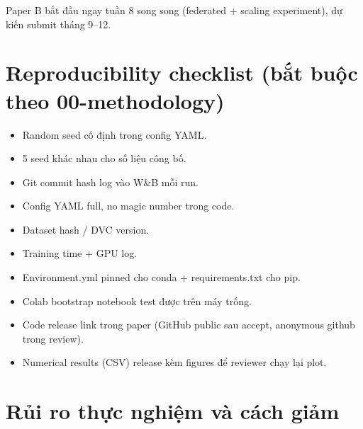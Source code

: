 \documentclass[11pt,a4paper]{article}
\begin{document}
Paper B bắt đầu ngay tuần 8 song song (federated + scaling experiment), dự kiến submit tháng 9--12.

\section{Reproducibility checklist (bắt buộc theo 00-methodology)}

\begin{itemize}
  \item[$\square$] Random seed cố định trong config YAML.
  \item[$\square$] 5 seed khác nhau cho số liệu công bố.
  \item[$\square$] Git commit hash log vào W\&B mỗi run.
  \item[$\square$] Config YAML full, no magic number trong code.
  \item[$\square$] Dataset hash / DVC version.
  \item[$\square$] Training time + GPU log.
  \item[$\square$] Environment.yml pinned cho conda + requirements.txt cho pip.
  \item[$\square$] Colab bootstrap notebook test được trên máy trống.
  \item[$\square$] Code release link trong paper (GitHub public sau accept, anonymous github trong review).
  \item[$\square$] Numerical results (CSV) release kèm figures để reviewer chạy lại plot.
\end{itemize}

\section{Rủi ro thực nghiệm và cách giảm}
\end{document}
